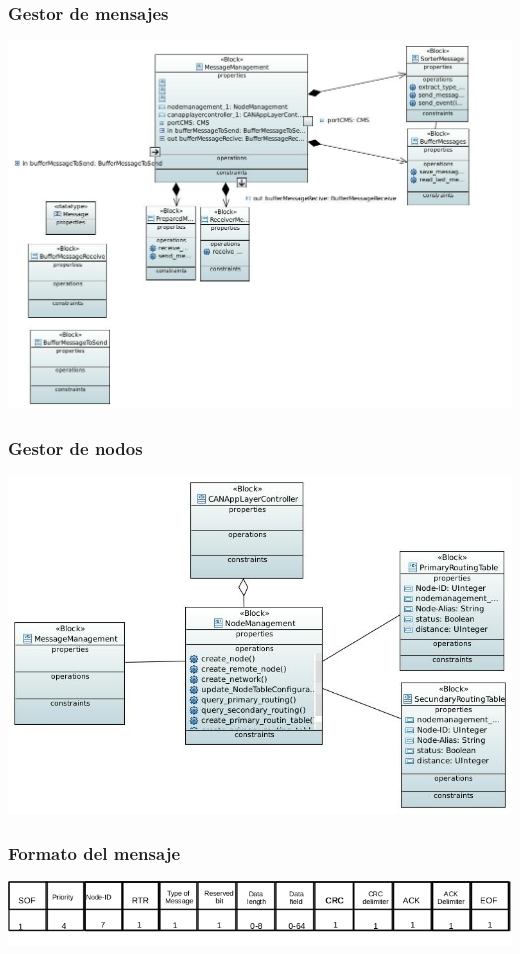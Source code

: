 \begin{frame}
	\frametitle{Gestor de mensajes}
	\centering
	\includegraphics[scale=0.3]{images/MessageManagement.JPG}
\end{frame}

\begin{frame}
	\frametitle{Gestor de nodos}
	\centering
	\includegraphics[scale=0.3]{images/NodeManagement.JPG}
\end{frame}

\begin{frame}
	\frametitle{Formato del mensaje}
	\centering
	\includegraphics[scale=0.4]{images/Data_Frame.jpg}
\end{frame}

